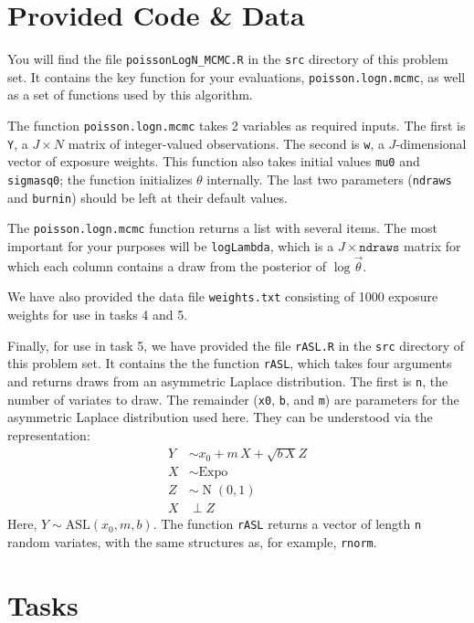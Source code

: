 \documentclass[11pt]{article}
\DeclareMathOperator{\Gaussian}{N}
\begin{document}
\section{Provided Code \& Data}

You will find the file \verb+poissonLogN_MCMC.R+ in the \verb+src+ directory of this problem set. It contains the key function for your evaluations, \verb+poisson.logn.mcmc+, as well as a set of functions used by this algorithm.

The function \verb+poisson.logn.mcmc+ takes 2 variables as required inputs. The first is \verb+Y+, a $J \times N$ matrix of integer-valued observations. The second is \verb+w+, a $J$-dimensional vector of exposure weights. This function also takes initial values \verb+mu0+ and \verb+sigmasq0+; the function initializes $\theta$ internally. The last two parameters (\verb+ndraws+ and \verb+burnin+) should be left at their default values.

The \verb+poisson.logn.mcmc+ function returns a list with several items. The most important for your purposes will be \verb+logLambda+, which is a $J \times \texttt{ndraws}$ matrix for which each column contains a draw from the posterior of $\log \vec \theta$.

We have also provided the data file \verb+weights.txt+ consisting of 1000 exposure weights for use in tasks 4 and 5.

Finally, for use in task 5, we have provided the file \verb+rASL.R+ in the \verb+src+ directory of this problem set. It contains the the function \verb+rASL+, which takes four arguments and returns draws from an asymmetric Laplace distribution. The first is \verb+n+, the number of variates to draw. The remainder (\verb+x0+, \verb+b+, and \verb+m+) are parameters for the asymmetric Laplace distribution used here. They can be understood via the representation:
\begin{align*}
 Y &\sim x_0 + m\,X + \sqrt{b\,X} Z \\
 X &\sim \textrm{Expo} \\
 Z &\sim \Gaussian(0,1) \\
 X &\perp Z
\end{align*}
Here, $Y \sim \textrm{ASL}(x_0, m, b)$. The function \verb+rASL+ returns a vector of length \verb+n+ random variates, with the same structures as, for example, \verb+rnorm+.

\section{Tasks}
\end{document}
